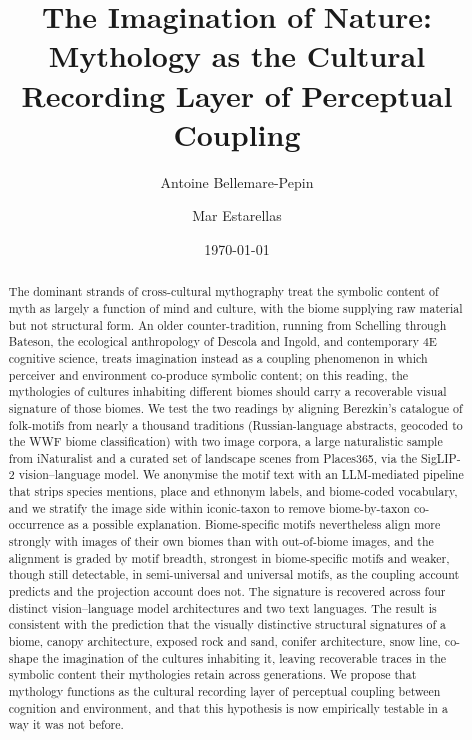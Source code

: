 \documentclass[11pt,a4paper]{article}
\title{\bfseries The Imagination of Nature:\\
\large Mythology as the Cultural Recording Layer of Perceptual Coupling}
\author[1]{Antoine Bellemare-Pepin}
\author[2]{Mar Estarellas}
\affil[1]{Department of Psychology, Université de Montréal}
\affil[2]{Department of Psychiatry, McGill University}
\date{\today}
\begin{document}
\maketitle

\begin{abstract}\noindent
The dominant strands of cross-cultural mythography treat the symbolic
content of myth as largely a function of mind and culture, with the
biome supplying raw material but not structural form. An older
counter-tradition, running from Schelling through Bateson, the
ecological anthropology of Descola and Ingold, and contemporary 4E
cognitive science, treats imagination instead as a coupling
phenomenon in which perceiver and environment co-produce symbolic
content; on this reading, the mythologies of cultures inhabiting
different biomes should carry a recoverable visual signature of
those biomes. We test the two readings by aligning Berezkin's
catalogue of folk-motifs from nearly a thousand traditions
(Russian-language abstracts, geocoded to the WWF biome
classification) with two image corpora, a large naturalistic
sample from iNaturalist and a curated set of landscape scenes from
Places365, via the SigLIP-2 vision--language model. We anonymise
the motif text with an LLM-mediated pipeline that strips species
mentions, place and ethnonym labels, and biome-coded vocabulary,
and we stratify the image side within iconic-taxon to remove
biome-by-taxon co-occurrence as a possible explanation. Biome-specific
motifs nevertheless align more strongly with images of their own
biomes than with out-of-biome images, and the alignment is
graded by motif breadth, strongest in biome-specific motifs and
weaker, though still detectable, in semi-universal and universal
motifs, as the coupling account predicts and the projection
account does not. The signature is recovered across four
distinct vision--language model architectures and two text
languages. The result is consistent
with the prediction that the visually distinctive structural
signatures of a biome, canopy architecture, exposed rock and sand,
conifer architecture, snow line, co-shape the imagination of the
cultures inhabiting it, leaving recoverable traces in the symbolic
content their mythologies retain across generations. We propose
that mythology functions as the cultural recording layer of
perceptual coupling between cognition and environment, and that
this hypothesis is now empirically testable in a way it was not
before.
\end{abstract}

\vspace{0.6em}
\end{document}
